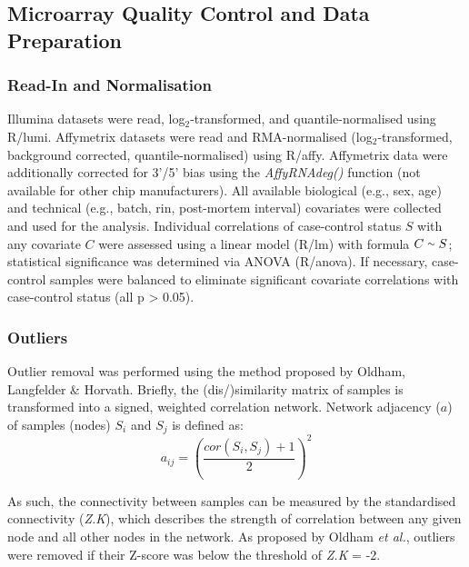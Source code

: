 \begin{method}
\subsection{Microarray Quality Control and Data Preparation} \label{sec:cellculture:quality}
\subsubsection{Read-In and Normalisation}
Illumina datasets were read, log$_2$-transformed, and quantile-normalised using R/lumi.\cite{Du2008} Affymetrix datasets were read and RMA-normalised (log$_2$-transformed, background corrected, quantile-normalised) using R/affy.\cite{Gautier2004} Affymetrix data were additionally corrected for 3'/5' bias using the \emph{AffyRNAdeg()} function (not available for other chip manufacturers). All available biological (e.g., sex, age) and technical (e.g., batch, \ac{rin}, post-mortem interval) covariates were collected and used for the analysis. Individual correlations of case-control status $S$ with any covariate $C$ were assessed using a linear model (R/lm) with formula $C \smallsim S$; statistical significance was determined via ANOVA (R/anova). If necessary, case-control samples were balanced to eliminate significant covariate correlations with case-control status (all p > 0.05).

\subsubsection{Outliers}
Outlier removal was performed using the method proposed by Oldham, Langfelder \& Horvath.\cite{Oldham2012} Briefly, the (dis\-/)similarity matrix of samples is transformed into a signed, weighted correlation network. Network adjacency ($a$) of samples (nodes) $S_i$ and $S_j$ is defined as: $$a_{ij} = \left(\frac{cor(S_i, S_j)+1}{2}\right)^2$$

As such, the connectivity between samples can be measured by the standardised connectivity (\emph{Z.K}), which describes the strength of correlation between any given node and all other nodes in the network. As proposed by Oldham \emph{et al.}\cite{Oldham2012}, outliers were removed if their Z-score was below the threshold of \emph{Z.K} = -2.


\end{method}
